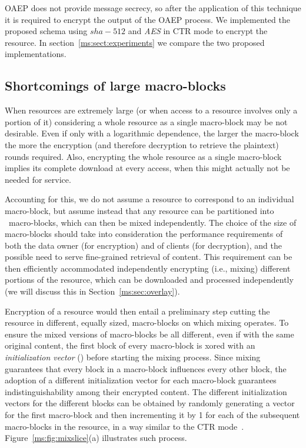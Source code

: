 {OAEP does not provide message secrecy, so after the application of this technique it is required to encrypt the output of the OAEP process. We implemented the proposed schema using $sha-512$ and {\em AES} in {CTR mode} to encrypt the resource.
In section~\ref{ms:sect:experiments} we compare the two proposed implementations.

} %

\subsection{Shortcomings of large macro-blocks}

When resources are extremely large (or when access to a resource involves only a portion of it) considering a whole resource as a single macro-block may be not desirable. Even if only with a logarithmic dependence, the larger the macro-block the more the encryption (and therefore decryption to retrieve the plaintext) rounds required. Also, encrypting the whole resource as a single macro-block implies its complete download at every access, when this might actually not be needed for service.

Accounting for this, we do not assume a resource to correspond to an individual macro-block, but assume instead that any resource can be partitioned into \Mnum\ macro-blocks, which can then be mixed independently. The choice of the size of macro-blocks should take into consideration the performance requirements of both the data owner (for encryption) and of clients (for decryption), and the possible need to serve fine-grained retrieval of content. This requirement can be then efficiently accommodated independently encrypting (i.e., mixing) different portions of the resource, which can be downloaded and processed independently (we will discuss this in Section~\ref{ms:sec:overlay}).

Encryption of a resource would then entail a preliminary step cutting the resource in different, equally sized, macro-blocks on which mixing operates. To ensure the mixed versions of macro-blocks be all different, even if with the same original content, the first block of every macro-block is {\sc xor}ed with an {\em initialization vector\/} () before starting the mixing process. Since mixing guarantees that every block in a macro-block influences every other block, the adoption of a different initialization vector for each macro-block guarantees indistinguishability among their encrypted content. The different initialization vectors for the different blocks can be obtained by randomly generating a vector for the first macro-block and then incrementing it by 1 for each of the subsequent macro-blocks in the resource, in a way similar to the CTR mode~\cite{d01}. Figure~\ref{ms:fig:mixslice}(a) illustrates such process.

